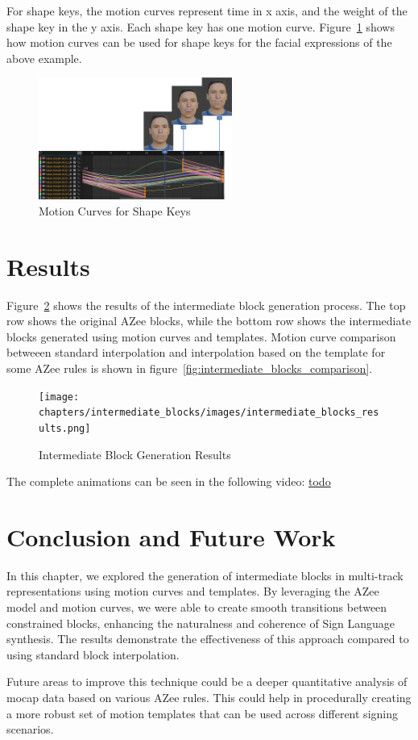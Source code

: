 \documentclass[../../main.tex]{subfiles}
\begin{document}
For shape keys, the motion curves represent time in x axis, and the weight of the shape key in the y axis. Each shape key has one motion curve. Figure~\ref{fig:motion_curves_shape_keys} shows how motion curves can be used for shape keys for the facial expressions of the above example.

\begin{figure}
    \centering \includegraphics[width = 2.5in]{chapters/intermediate_blocks/images/motion_curves_shape_keys.png}
    \caption{Motion Curves for Shape Keys}
    \label{fig:motion_curves_shape_keys}
\end{figure}

\section{Results}
\label{ch:intermediate_blocks:results}

Figure~\ref{fig:intermediate_blocks_results} shows the results of the intermediate block generation process. The top row shows the original AZee blocks, while the bottom row shows the intermediate blocks generated using motion curves and templates. Motion curve comparison betweeen standard interpolation and interpolation based on the template for some AZee rules is shown in figure~\ref{fig:intermediate_blocks_comparison}.

\begin{figure}
    \centering \texttt{[image: chapters/intermediate\_blocks/images/intermediate\_blocks\_results.png]}
    \caption{Intermediate Block Generation Results}
    \label{fig:intermediate_blocks_results}
\end{figure}

The complete animations can be seen in the following video: \url{todo}

\section{Conclusion and Future Work}
\label{ch:intermediate_blocks:conclusion_and_future_work}

In this chapter, we explored the generation of intermediate blocks in multi-track representations using motion curves and templates. By leveraging the AZee model and motion curves, we were able to create smooth transitions between constrained blocks, enhancing the naturalness and coherence of Sign Language synthesis. The results demonstrate the effectiveness of this approach compared to using standard block interpolation. 

Future areas to improve this technique could be a deeper quantitative analysis of mocap data based on various AZee rules. This could help in procedurally creating a more robust set of motion templates that can be used across different signing scenarios.
\end{document}
